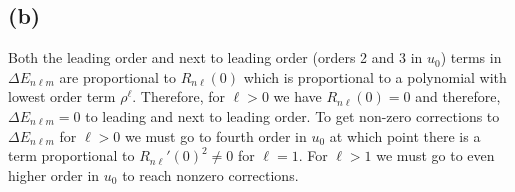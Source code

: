 \documentclass[12pt]{extarticle}
\begin{document}
\subsection*{(b)}
Both the leading order and next to leading order (orders 2 and 3 in $u_0$) terms in $\Delta E_{n \ell m}$ are proportional to $R_{n \ell}(0)$ which is proportional to a polynomial with lowest order term $\rho^{\ell}$. Therefore, for $\ell > 0$ we have $R_{n \ell}(0) = 0$ and therefore, $\Delta E_{n \ell m} = 0$ to leading and next to leading order. To get non-zero corrections to $\Delta E_{n \ell m}$ for $\ell > 0$ we must go to fourth order in $u_0$ at which point there is a term proportional to $R_{n \ell}'(0)^2 \neq 0$ for $\ell = 1$. For $\ell > 1$ we must go to even higher order in $u_0$ to reach nonzero corrections.    
\end{document}
